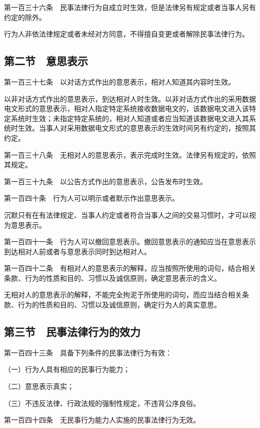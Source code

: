 \documentclass[UTF8,12pt,a4paper]{ctexbook}
\begin{document}
第一百三十六条　民事法律行为自成立时生效，但是法律另有规定或者当事人另有约定的除外。

行为人非依法律规定或者未经对方同意，不得擅自变更或者解除民事法律行为。

\subsection*{第二节　意思表示}

第一百三十七条　以对话方式作出的意思表示，相对人知道其内容时生效。

以非对话方式作出的意思表示，到达相对人时生效。以非对话方式作出的采用数据电文形式的意思表示，相对人指定特定系统接收数据电文的，该数据电文进入该特定系统时生效；未指定特定系统的，相对人知道或者应当知道该数据电文进入其系统时生效。当事人对采用数据电文形式的意思表示的生效时间另有约定的，按照其约定。

第一百三十八条　无相对人的意思表示，表示完成时生效。法律另有规定的，依照其规定。

第一百三十九条　以公告方式作出的意思表示，公告发布时生效。

第一百四十条　行为人可以明示或者默示作出意思表示。

沉默只有在有法律规定、当事人约定或者符合当事人之间的交易习惯时，才可以视为意思表示。

第一百四十一条　行为人可以撤回意思表示。撤回意思表示的通知应当在意思表示到达相对人前或者与意思表示同时到达相对人。

第一百四十二条　有相对人的意思表示的解释，应当按照所使用的词句，结合相关条款、行为的性质和目的、习惯以及诚信原则，确定意思表示的含义。

无相对人的意思表示的解释，不能完全拘泥于所使用的词句，而应当结合相关条款、行为的性质和目的、习惯以及诚信原则，确定行为人的真实意思。

\subsection*{第三节　民事法律行为的效力}

第一百四十三条　具备下列条件的民事法律行为有效：

（一）行为人具有相应的民事行为能力；

（二）意思表示真实；

（三）不违反法律、行政法规的强制性规定，不违背公序良俗。

第一百四十四条　无民事行为能力人实施的民事法律行为无效。
\end{document}
